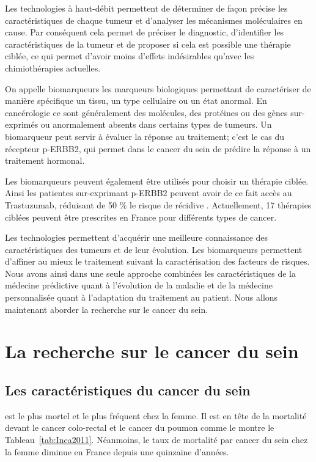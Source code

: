 			Les technologies à haut-débit permettent de déterminer de façon précise les caractéristiques de chaque tumeur et d'analyser les mécanismes moléculaires en cause.
			Par conséquent cela permet de préciser le diagnostic, d'identifier les caractéristiques de la tumeur et de proposer si cela est possible une thérapie ciblée, ce qui permet d'avoir moins d'effets indésirables qu'avec les chimiothérapies actuelles.

			On appelle biomarqueurs les marqueurs biologiques permettant de caractériser de manière spécifique un tissu, un type cellulaire ou un état anormal.
			En cancérologie ce sont généralement des molécules, des protéines ou des gènes sur-exprimés ou anormalement absents dans certains types de tumeurs.
			Un biomarqueur peut servir à évaluer la réponse au traitement; c'est le cas du récepteur \acs{p-ERBB2}, qui permet dans le cancer du sein de prédire la réponse à un traitement hormonal.

			Les biomarqueurs peuvent également être utilisés pour choisir un thérapie ciblée.
			Ainsi les patientes sur-exprimant \acs{p-ERBB2} peuvent avoir de ce fait accès au Trastuzumab, réduisant de 50 \% le risque de récidive \citep{Hudis2007}.
			Actuellement, 17 thérapies ciblées peuvent être prescrites en France pour différents types de cancer.

			Les technologies permettent d'acquérir une meilleure connaissance des caractéristiques des tumeurs et de leur évolution.
			Les biomarqueurs permettent d'affiner au mieux le traitement suivant la caractérisation des facteurs de risques.
			Nous avons ainsi dans une seule approche combinées les caractéristiques de la médecine prédictive quant à l'évolution de la maladie et de la médecine personnalisée quant à l'adaptation du traitement au patient.
			Nous allons maintenant aborder la recherche sur le cancer du sein.

	\section{\textcolor{red!45!black}{La recherche sur le cancer du sein}}\label{Sec:RechercheBC}

		\subsection{\textcolor{red!45!black}{Les caractéristiques du cancer du sein}}
			 est le plus mortel et le plus fréquent chez la femme.
			Il est en tête de la mortalité devant le cancer colo-rectal et le cancer du poumon comme le montre le Tableau~\ref{tab:Inca2011}.
			Néanmoins, le taux de mortalité par cancer du sein chez la femme diminue en France depuis une quinzaine d'années.

